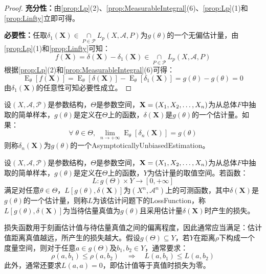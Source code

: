 \begin{proof}
	\textbf{充分性：}由\cref{prop:Lp}(2)、\cref{prop:MeasurableIntegral}(6)、\cref{prop:Lp}(1)和\cref{prop:Linfty}立即可得。\par
	\textbf{必要性：}任取$\delta_1(\mathbf{X})\in\underset{P\in\mathscr{P}}{\cap}L_p(X,\mathscr{A},P)$为$g(\theta)$的一个无偏估计量，由\cref{prop:Lp}(1)和\cref{prop:Linfty}可知：
	\begin{equation*}
		f(\mathbf{X})=\delta(\mathbf{X})-\delta_1(\mathbf{X})\in\underset{P\in\mathscr{P}}{\cap}L_p(X,\mathscr{A},P)
	\end{equation*}
	根据\cref{prop:Lp}(2)和\cref{prop:MeasurableIntegral}(6)可得：
	\begin{equation*}
		\operatorname{E}_\theta[f(\mathbf{X})]=\operatorname{E}_\theta[\delta(\mathbf{X})]-\operatorname{E}_\theta[\delta_1(\mathbf{X})]=g(\theta)-g(\theta)=0
	\end{equation*}
	由$\delta_1(\mathbf{X})$的任意性可知必要性成立。
\end{proof}
\begin{definition}
	设$(X,\mathscr{A},\mathscr{P})$是参数结构，$\Theta$是参数空间，$\mathbf{X}=(X_1, X_2, \dots, X_{n})$为从总体$F$中抽取的简单样本，$g(\theta)$是定义在$\Theta$上的函数，$\delta(\mathbf{X})$是$g(\theta)$的一个估计量。如果：
	\begin{equation*}
		\forall\;\theta\in\Theta,\;\lim_{n\to+\infty}\operatorname{E}_{\theta}[\delta_n(\mathbf{X})]=g(\theta)
	\end{equation*}
	则称$\delta_n(\mathbf{X})$为$g(\theta)$的一个\gls{AsymptoticallyUnbiasedEstimation}。
\end{definition}
\begin{definition}
	设$(X,\mathscr{A},\mathscr{P})$是参数结构，$\Theta$是参数空间，$\mathbf{X}=(X_1, X_2, \dots, X_{n})$为从总体$F$中抽取的简单样本，$g(\theta)$是定义在$\Theta$上的函数，$Y$为估计量的取值空间。若函数：
	\begin{equation*}
		L:g(\Theta)\times Y\to[0,+\infty]
	\end{equation*}
	满足对任意$\theta\in\Theta$，$L[g(\theta),\delta(\mathbf{X})]$为$(X^n,\mathscr{A}^n)$上的可测函数，其中$\delta(\mathbf{X})$是$g(\theta)$的一个估计量，则称$L$为该估计问题下的\gls{LossFunction}，称$L[g(\theta),\delta(\mathbf{X})]$为当待估量真值为$g(\theta)$且采用估计量$\delta(\mathbf{X})$时产生的损失。
\end{definition}
\begin{note}
	损失函数用于刻画估计值与待估量真值之间的偏离程度，因此通常应当满足：估计值距离真值越远，所产生的损失越大。假设$g(\Theta)\subseteq Y$，若$Y$在距离$\rho$下构成一个度量空间，则对于任意$a\in g(\Theta)$及$b_1,b_2\in Y$，通常要求：
	\begin{equation*}
		\rho(a,b_1)\leqslant\rho(a,b_2)\quad\Longrightarrow\quad L(a,b_1)\leqslant L(a,b_2)
	\end{equation*}
	此外，通常还要求$L(a,a)=0$，即估计值等于真值时损失为零。
\end{note}
